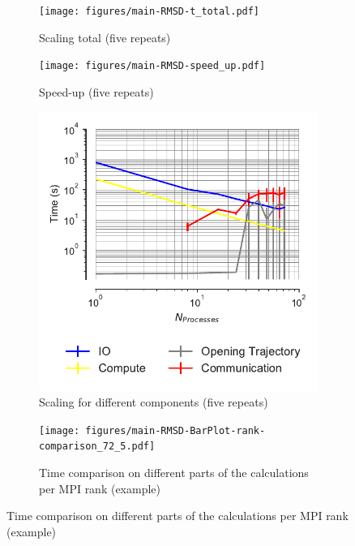 \begin{figure}[!htb]
  \centering
  \begin{subfigure}{.49\textwidth}
    \texttt{[image: figures/main-RMSD-t\_total.pdf]}
    \captionsetup{format=hang}
    \caption{Scaling total (five repeats)}
    \label{fig:MPIscaling}
  \end{subfigure}
  \hfill
  \begin{subfigure}{.49\textwidth}
    \texttt{[image: figures/main-RMSD-speed\_up.pdf]}
    \captionsetup{format=hang}
    \caption{Speed-up (five repeats)}
    \label{fig:MPIspeedup}
  \end{subfigure}
  \bigskip

  \begin{subfigure}{.49\textwidth}
    \includegraphics[width=\linewidth]{figures/main-RMSD-time_comp_IO_comparison.pdf}
    \captionsetup{format=hang}
    \caption{Scaling for different components (five repeats)}
    \label{fig:ScalingComputeIO}
  \end{subfigure}
  \hfill
  \begin{subfigure} {.5\textwidth}
    \texttt{[image: figures/main-RMSD-BarPlot-rank-comparison\_72\_5.pdf]}
    \captionsetup{format=hang}
    \caption{Time comparison on different parts of the calculations per MPI rank (example)}
    \label{fig:MPIranks}
  \end{subfigure}

\end{figure}
